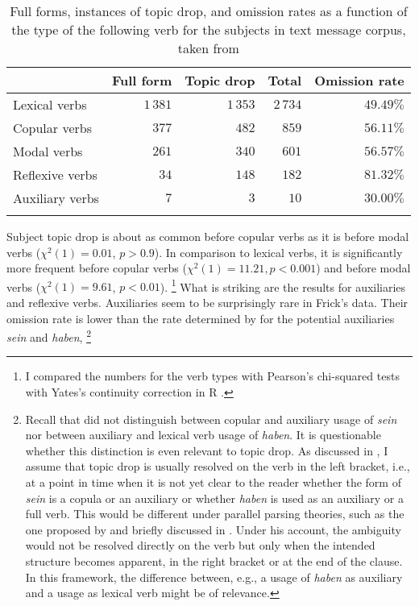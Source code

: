 \begin{table}
\caption[Verb types after subject topic drop in \citet{frick2017}]{Full forms, instances of topic drop, and omission rates as a function of the type of the following verb for the subjects in  text message corpus, taken from \citet[93]{frick2017}}
\centering
\begin{tabular}{lrrrr}
\lsptoprule
\multicolumn{1}{c}{Verb type} & \multicolumn{1}{c}{Full form} & \multicolumn{1}{c}{Topic drop} & \multicolumn{1}{c}{Total} & \multicolumn{1}{c}{Omission rate} \\
\midrule
Lexical verbs & $1\,381$ & $1\,353$ & $2\,734$ & $49.49\%$ \\
Copular verbs & $377$ & $482$ & $859$ &  $56.11\%$ \\
Modal verbs & $261$ & $340$ & $601$ & $56.57\%$ \\
Reflexive verbs & $34$ & $148$ & $182$ & $81.32\%$ \\
Auxiliary verbs & $7$ & $3$ & $10$ & $30.00\%$ \\
\lspbottomrule
\end{tabular}
\label{tab:verb.type.frick}
\end{table}
\noindent
Subject topic drop is about as common before copular verbs as it is before modal verbs ($\chi^2(1) = 0.01$, $p > 0.9$).
In comparison to lexical verbs, it is significantly more frequent before copular verbs ($\chi^2(1) = 11.21, p < 0.001$) and before modal verbs ($\chi^2(1) = 9.61$, $p < 0.01$).%
\footnote{I compared the numbers for the verb types with Pearson's chi-squared tests with Yates's continuity correction in R \citep{rcoreteam2021}.}
%
What is striking are the results for auxiliaries and reflexive verbs.
Auxiliaries seem to be surprisingly rare in Frick's data.
Their omission rate is lower than the rate determined by \citet{androutsopoulos.schmidt2002} for the potential auxiliaries \textit{sein} and \textit{haben},%
\footnote{Recall that \citet{androutsopoulos.schmidt2002} did not distinguish between copular and auxiliary usage of \textit{sein} nor between auxiliary and lexical verb usage of \textit{haben}.
It is questionable whether this distinction is even relevant to topic drop.
As discussed in , I assume that topic drop is usually resolved on the verb in the left bracket, i.e., at a point in time when it is not yet clear to the reader whether the form of \textit{sein} is a copula or an auxiliary or whether \textit{haben} is used as an auxiliary or a full verb.
This would be different under parallel parsing theories, such as the one proposed by \citet{levy2008} and briefly discussed in .
Under his account, the ambiguity  would not be resolved directly on the verb but only when the intended structure becomes apparent, in the right bracket or at the end of the clause.
In this framework, the difference between, e.g., a usage of \textit{haben} as auxiliary and a usage as lexical verb might be of relevance.}
